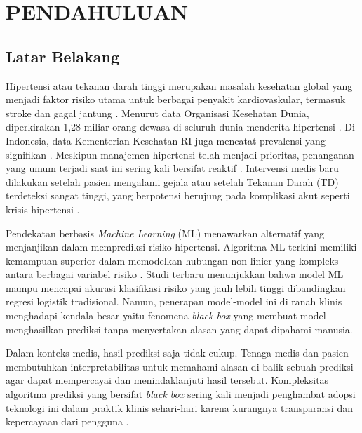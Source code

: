 \chapter{PENDAHULUAN}
\label{chap:pendahuluan}

\section{Latar Belakang}
Hipertensi atau tekanan darah tinggi merupakan masalah kesehatan global yang menjadi faktor risiko utama untuk berbagai penyakit kardiovaskular, termasuk stroke dan gagal jantung \parencite{Mills2020Global}. Menurut data Organisasi Kesehatan Dunia, diperkirakan 1,28 miliar orang dewasa di seluruh dunia menderita hipertensi \parencite{WHO2023}. Di Indonesia, data Kementerian Kesehatan RI juga mencatat prevalensi yang signifikan \parencite{Riskesdas2018}. Meskipun manajemen hipertensi telah menjadi prioritas, penanganan yang umum terjadi saat ini sering kali bersifat reaktif \parencite{Whelton2018Guideline}. Intervensi medis baru dilakukan setelah pasien mengalami gejala atau setelah Tekanan Darah (TD) terdeteksi sangat tinggi, yang berpotensi berujung pada komplikasi akut seperti krisis hipertensi \parencite{Kurtz2021}.

Pendekatan berbasis \textit{Machine Learning} (ML) menawarkan alternatif yang menjanjikan dalam memprediksi risiko hipertensi. Algoritma ML terkini memiliki kemampuan superior dalam memodelkan hubungan non-linier yang kompleks antara berbagai variabel risiko \parencite{Tarimana2024}. Studi terbaru menunjukkan bahwa model ML mampu mencapai akurasi klasifikasi risiko yang jauh lebih tinggi dibandingkan regresi logistik tradisional. Namun, penerapan model-model ini di ranah klinis menghadapi kendala besar yaitu fenomena \textit{black box} yang membuat model menghasilkan prediksi tanpa menyertakan alasan yang dapat dipahami manusia.

Dalam konteks medis, hasil prediksi saja tidak cukup. Tenaga medis dan pasien membutuhkan interpretabilitas untuk memahami alasan di balik sebuah prediksi agar dapat mempercayai dan menindaklanjuti hasil tersebut. Kompleksitas algoritma prediksi yang bersifat \textit{black box} sering kali menjadi penghambat adopsi teknologi ini dalam praktik klinis sehari-hari karena kurangnya transparansi dan kepercayaan dari pengguna \parencite{Adadi2018}.

